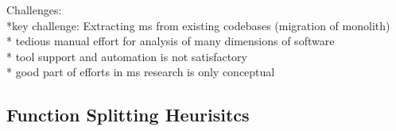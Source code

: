 Challenges:\\
*key challenge: Extracting ms from existing codebases (migration of monolith)\\
* tedious manual effort for analysis of many dimensions of software\\
* tool support and automation is not satisfactory\\
* good part of efforts in ms research is only conceptual \\

\subsection{Function Splitting Heurisitcs}
\cite{HeuristicsAlwis} \\





